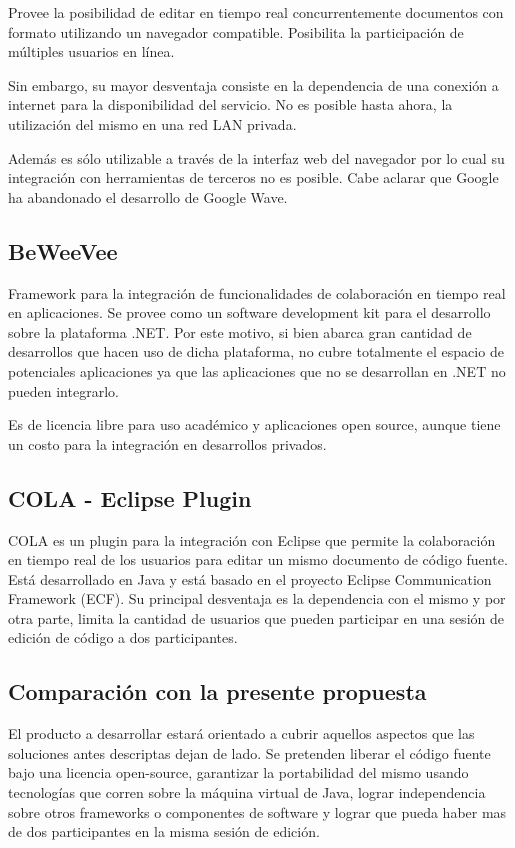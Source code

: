\documentclass[12pt,a4paper]{article}
\begin{document}
	Provee la posibilidad de editar en tiempo real concurrentemente documentos con formato utilizando un navegador compatible. Posibilita la participación de múltiples usuarios en línea.

	Sin embargo, su mayor desventaja consiste en la dependencia de una conexión a internet para la disponibilidad del servicio. No es posible hasta ahora, la utilización del mismo en una red LAN privada.

	 Además es sólo utilizable a través de la interfaz web del navegador por lo cual su integración con herramientas de terceros no es posible. Cabe aclarar que Google ha abandonado el desarrollo de Google Wave.

	

	\subsection{BeWeeVee \cite{beeweevee}}

	Framework para la integración de funcionalidades de colaboración en tiempo real en aplicaciones. Se provee como un software development kit para el desarrollo sobre la plataforma .NET. Por este motivo, si bien abarca gran cantidad de desarrollos que hacen uso de dicha plataforma, no cubre totalmente el espacio de potenciales aplicaciones ya que las aplicaciones que no se desarrollan en .NET no pueden integrarlo.

	Es de licencia libre para uso académico y aplicaciones open source, aunque tiene un costo para la integración en desarrollos privados.



	\subsection{COLA \cite{cola} - Eclipse Plugin}

	COLA es un plugin para la integración con Eclipse que permite la colaboración en tiempo real de los usuarios para editar un mismo documento de código fuente. Está desarrollado en Java y está basado en el proyecto Eclipse Communication Framework (ECF). Su principal desventaja es la dependencia con el mismo y por otra parte, limita la cantidad de usuarios que pueden participar en una sesión de edición de código a dos participantes.

	\subsection{Comparación con la presente propuesta}
El producto a desarrollar estará orientado a cubrir aquellos aspectos que las soluciones antes descriptas dejan de lado. Se pretenden liberar el código fuente bajo una licencia open-source, garantizar la portabilidad del mismo usando tecnologías que corren sobre la máquina virtual de Java, lograr independencia sobre otros frameworks o componentes de software y lograr que pueda haber mas de dos participantes en la misma sesión de edición.
\end{document}
